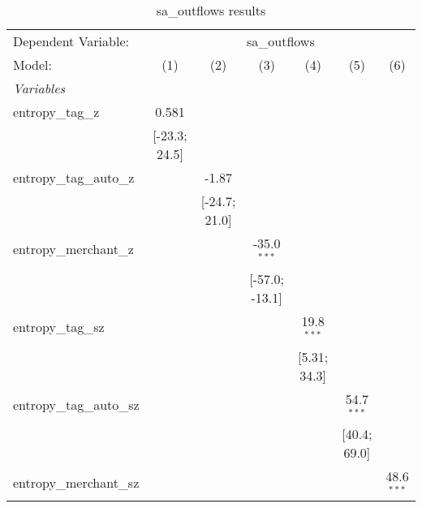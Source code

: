 
\begin{table}[htbp]
   \centering
   \tiny
   \begin{threeparttable}[b]
      \caption{\label{tab:reg_sa_outflows_full_nofe.tex} sa\_outflows results}
      \begin{tabular}{lcccccc}
         \tabularnewline \midrule \midrule
         Dependent Variable: & \multicolumn{6}{c}{sa\_outflows}\\
         Model:                    & (1)              & (2)              & (3)              & (4)              & (5)              & (6)\\  
         \midrule
         \emph{Variables}\\
         entropy\_tag\_z           & 0.581            &                  &                  &                  &                  &   \\   
                                   & [-23.3; 24.5]    &                  &                  &                  &                  &   \\   
         entropy\_tag\_auto\_z     &                  & -1.87            &                  &                  &                  &   \\   
                                   &                  & [-24.7; 21.0]    &                  &                  &                  &   \\   
         entropy\_merchant\_z      &                  &                  & -35.0$^{***}$    &                  &                  &   \\   
                                   &                  &                  & [-57.0; -13.1]   &                  &                  &   \\   
         entropy\_tag\_sz          &                  &                  &                  & 19.8$^{***}$     &                  &   \\   
                                   &                  &                  &                  & [5.31; 34.3]     &                  &   \\   
         entropy\_tag\_auto\_sz    &                  &                  &                  &                  & 54.7$^{***}$     &   \\   
                                   &                  &                  &                  &                  & [40.4; 69.0]     &   \\   
         entropy\_merchant\_sz     &                  &                  &                  &                  &                  & 48.6$^{***}$\\   

\end{tabular}
\end{threeparttable}
\end{table}
